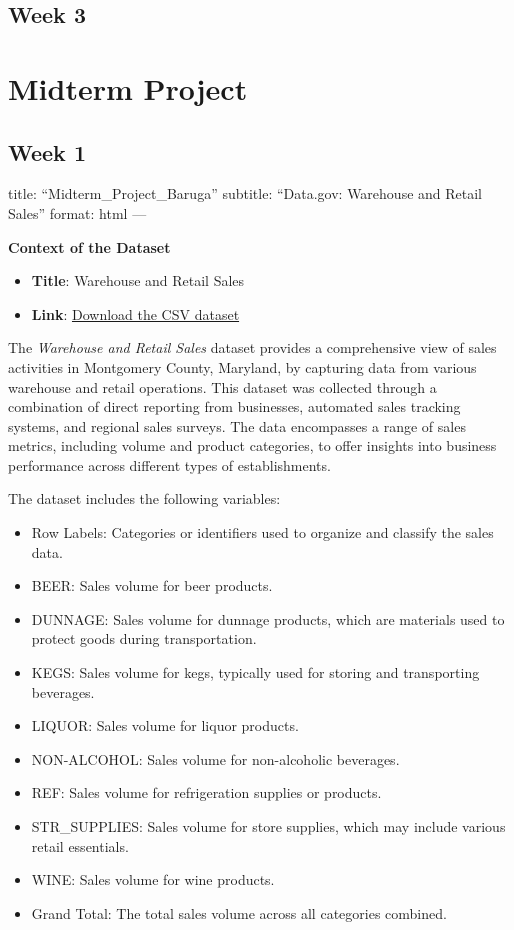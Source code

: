\documentclass[
  letterpaper,
  DIV=11,
  numbers=noendperiod]{scrreprt}
\providecommand{\tightlist}{%
  \setlength{\itemsep}{0pt}\setlength{\parskip}{0pt}}\usepackage{longtable,booktabs,array}
\begin{document}
\subsection{Week 3}\label{week-3-6}

\section{Midterm Project}\label{midterm-project-2}

\subsection{Week 1}\label{week-1-8}

title: ``Midterm\_Project\_Baruga'' subtitle: ``Data.gov: Warehouse and
Retail Sales'' format: html ---

\textbf{Context of the Dataset}

\begin{itemize}
\tightlist
\item
  \textbf{Title}: Warehouse and Retail Sales
\item
  \textbf{Link}:
  \href{https://data.montgomerycountymd.gov/api/views/v76h-r7br/rows.csv?accessType=DOWNLOAD}{Download
  the CSV dataset}
\end{itemize}

The \emph{Warehouse and Retail Sales} dataset provides a comprehensive
view of sales activities in Montgomery County, Maryland, by capturing
data from various warehouse and retail operations. This dataset was
collected through a combination of direct reporting from businesses,
automated sales tracking systems, and regional sales surveys. The data
encompasses a range of sales metrics, including volume and product
categories, to offer insights into business performance across different
types of establishments.

The dataset includes the following variables:

\begin{itemize}
\tightlist
\item
  Row Labels: Categories or identifiers used to organize and classify
  the sales data.
\item
  BEER: Sales volume for beer products.
\item
  DUNNAGE: Sales volume for dunnage products, which are materials used
  to protect goods during transportation.
\item
  KEGS: Sales volume for kegs, typically used for storing and
  transporting beverages.
\item
  LIQUOR: Sales volume for liquor products.
\item
  NON-ALCOHOL: Sales volume for non-alcoholic beverages.
\item
  REF: Sales volume for refrigeration supplies or products.
\item
  STR\_SUPPLIES: Sales volume for store supplies, which may include
  various retail essentials.
\item
  WINE: Sales volume for wine products.
\item
  Grand Total: The total sales volume across all categories combined.
\end{itemize}
\end{document}
